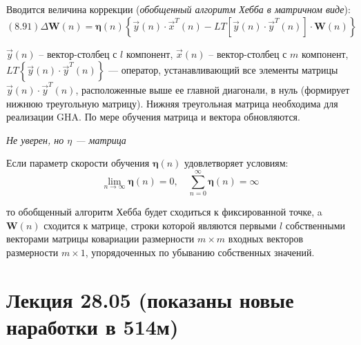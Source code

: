 \documentclass{article}
\numberwithin{equation}{subsection}
\begin{document}
Вводится величина коррекции (\textit{обобщенный алгоритм Хебба в матричном виде}):
\begin{equation}
    (8.91)
    \Delta \mathbf{W}(n) = \mathbf{\eta}(n) 
    \left\{
        \vec{y}(n) \cdot \vec{x}^T(n) - LT
        \left[
            \vec{y}(n) \cdot \vec{y}^T(n)
        \right]
        \cdot \mathbf{W}(n)        
    \right\}
\end{equation}

\noindent
$\vec{y}(n)$ -- вектор-столбец с $l$ компонент, $\vec{x}(n)$ -- вектор-столбец с $m$ компонент,
$LT\left\{ \vec{y}(n) \cdot \vec{y}^T(n) \right\}$ --- оператор, устанавливающий все элементы 
матрицы $\vec{y}(n) \cdot \vec{y}^T(n)$, расположенные выше ее главной диагонали, в нуль
(формирует нижнюю треугольную матрицу).
Нижняя треугольная матрица необходима для реализации GHA. По мере обучения матрица и вектора 
обновляются.

\begin{myquote}
    \textit{Не уверен, но $\eta$ --- матрица}
\end{myquote}

Если параметр скорости обучения $\mathbf{\eta}(n)$ удовлетворяет условиям:
\begin{equation*}
    \lim_{n \to \infty} \mathbf{\eta}(n) = 0, \quad
    \sum_{n=0}^{\infty} \mathbf{\eta}(n) = \infty
\end{equation*}

\noindent
то обобщенный алгоритм Хебба будет сходиться к фиксированной точке, a $\mathbf{W}(n)$ сходится 
к матрице, строки которой являются первыми $l$ собственными векторами матрицы ковариации
размерности $m \times m$ входных векторов размерности $m \times 1$, упорядоченных по убыванию 
собственных значений.




\section{Лекция 28.05 (показаны новые наработки в 514м)}
\end{document}

